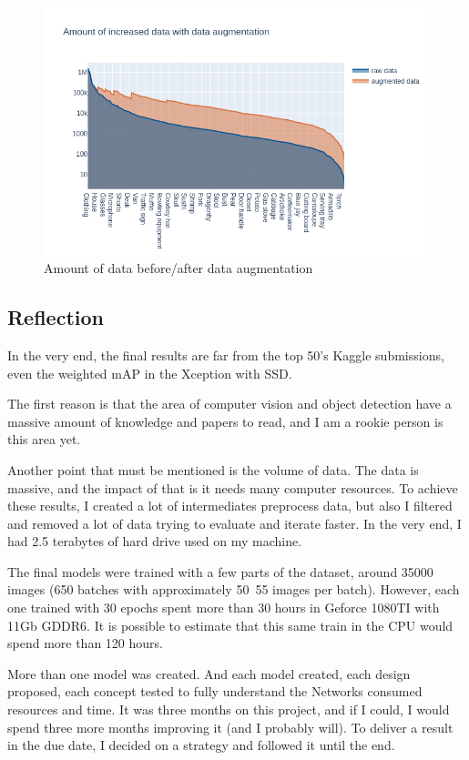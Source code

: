 \documentclass[11pt, a4paper, twocolumn]{article}
\begin{document}
\begin{figure}[ht]
	\centering
	\includegraphics[width=1\textwidth]{data-aug1.png}
	\caption{Amount of data before/after data augmentation}
	\label{augincreased}
\end{figure}

\subsection{Reflection}

In the very end, the final results are far from the top 50's Kaggle submissions, even the weighted mAP in the Xception with SSD.

The first reason is that the area of computer vision and object detection have a massive amount of knowledge and papers to read, and I am a rookie person is this area yet.

Another point that must be mentioned is the volume of data. The data is massive, and the impact of that is it needs many computer resources. To achieve these results, I created a lot of intermediates preprocess data, but also I filtered and removed a lot of data trying to evaluate and iterate faster. In the very end, I had 2.5 terabytes of hard drive used on my machine.

The final models were trained with a few parts of the dataset, around 35000 images (650 batches with approximately 50~55 images per batch). However, each one trained with 30 epochs spent more than 30 hours in Geforce 1080TI with 11Gb GDDR6. It is possible to estimate that this same train in the CPU would spend more than 120 hours.

More than one model was created. And each model created, each design proposed, each concept tested to fully understand the Networks consumed resources and time. It was three months on this project, and if I could, I would spend three more months improving it (and I probably will). To deliver a result in the due date, I decided on a strategy and followed it until the end.
\end{document}
